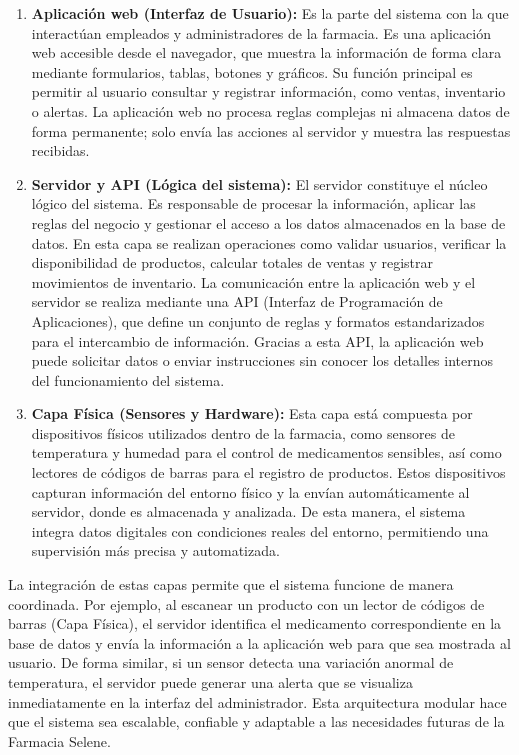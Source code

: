 \begin{enumerate}
\item \textbf{Aplicación web (Interfaz de Usuario):}
Es la parte del sistema con la que interactúan empleados y administradores de la farmacia. Es una aplicación web accesible desde el navegador, que muestra la información de forma clara mediante formularios, tablas, botones y gráficos.
Su función principal es permitir al usuario consultar y registrar información, como ventas, inventario o alertas. La aplicación web no procesa reglas complejas ni almacena datos de forma permanente; solo envía las acciones al servidor y muestra las respuestas recibidas.

\item \textbf{Servidor y API (Lógica del sistema):}  
El servidor constituye el núcleo lógico del sistema. Es responsable de procesar la información, aplicar las reglas del negocio y gestionar el acceso a los datos almacenados en la base de datos.  
En esta capa se realizan operaciones como validar usuarios, verificar la disponibilidad de productos, calcular totales de ventas y registrar movimientos de inventario.  
La comunicación entre la aplicación web y el servidor se realiza mediante una API (Interfaz de Programación de Aplicaciones), que define un conjunto de reglas y formatos estandarizados para el intercambio de información. Gracias a esta API, la aplicación web puede solicitar datos o enviar instrucciones sin conocer los detalles internos del funcionamiento del sistema.

\item \textbf{Capa Física (Sensores y Hardware):}  
Esta capa está compuesta por dispositivos físicos utilizados dentro de la farmacia, como sensores de temperatura y humedad para el control de medicamentos sensibles, así como lectores de códigos de barras para el registro de productos.  
Estos dispositivos capturan información del entorno físico y la envían automáticamente al servidor, donde es almacenada y analizada. De esta manera, el sistema integra datos digitales con condiciones reales del entorno, permitiendo una supervisión más precisa y automatizada.

\end{enumerate}

La integración de estas capas permite que el sistema funcione de manera coordinada. Por ejemplo, al escanear un producto con un lector de códigos de barras (Capa Física), el servidor identifica el medicamento correspondiente en la base de datos y envía la información a la aplicación web para que sea mostrada al usuario. De forma similar, si un sensor detecta una variación anormal de temperatura, el servidor puede generar una alerta que se visualiza inmediatamente en la interfaz del administrador. Esta arquitectura modular hace que el sistema sea escalable, confiable y adaptable a las necesidades futuras de la Farmacia Selene.











